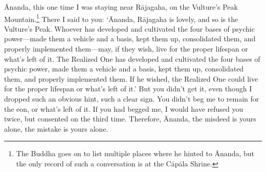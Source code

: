 \documentclass[12pt,openany]{book}%
\begin{document}
Ānanda, this one time I was staying near \textsanskrit{Rājagaha}, on the Vulture’s Peak Mountain.\footnote{The Buddha goes on to list multiple places where he hinted to Ānanda, but the only record of such a conversation is at the \textsanskrit{Cāpāla} Shrine. } There I said to you: ‘Ānanda, \textsanskrit{Rājagaha} is lovely, and so is the Vulture’s Peak. Whoever has developed and cultivated the four bases of psychic power—made them a vehicle and a basis, kept them up, consolidated them, and properly implemented them—may, if they wish, live for the proper lifespan or what’s left of it. The Realized One has developed and cultivated the four bases of psychic power, made them a vehicle and a basis, kept them up, consolidated them, and properly implemented them. If he wished, the Realized One could live for the proper lifespan or what’s left of it.’ But you didn’t get it, even though I dropped such an obvious hint, such a clear sign. You didn’t beg me to remain for the eon, or what’s left of it. If you had begged me, I would have refused you twice, but consented on the third time. Therefore, Ānanda, the misdeed is yours alone, the mistake is yours alone. 
\end{document}
